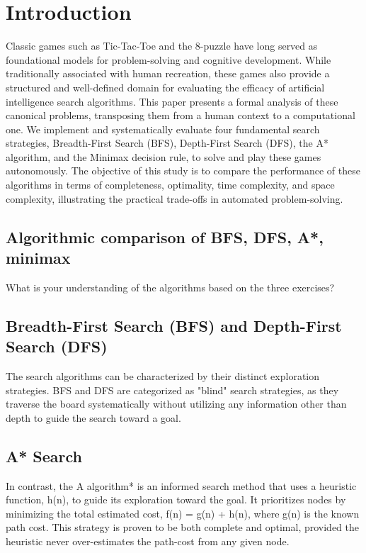 \documentclass[journal]{./IEEE/IEEEtran}
\title{\SPTITLE}
\author{\ADVISEEA~and~\ADVISEEB%
\REMARK
}
\begin{document}
\maketitle

\section{Introduction}
Classic games such as Tic-Tac-Toe and the 8-puzzle have long served as foundational models for problem-solving and cognitive development. While traditionally associated with human recreation, these games also provide a structured and well-defined domain for evaluating the efficacy of artificial intelligence search algorithms. This paper presents a formal analysis of these canonical problems, transposing them from a human context to a computational one. We implement and systematically evaluate four fundamental search strategies, Breadth-First Search (BFS), Depth-First Search (DFS), the A* algorithm, and the Minimax decision rule, to solve and play these games autonomously. The objective of this study is to compare the performance of these algorithms in terms of completeness, optimality, time complexity, and space complexity, illustrating the practical trade-offs in automated problem-solving.

\subsection{Algorithmic comparison of BFS, DFS, A*, minimax}
What is your understanding of the algorithms based on the three exercises?

\subsection{Breadth-First Search (BFS) and Depth-First Search (DFS)}
The search algorithms can be characterized by their distinct exploration strategies. BFS and DFS are categorized as "blind" search strategies, as they traverse the board systematically without utilizing any information other than depth to guide the search toward a goal.\cite{geeksforgeeks-Uninformed-Search-Algorithms-in-AI}

\subsection{A* Search}
In contrast, the A algorithm* is an informed search method that uses a heuristic function, h(n), to guide its exploration toward the goal. It prioritizes nodes by minimizing the total estimated cost, f(n) = g(n) + h(n), where g(n) is the known path cost. This strategy is proven to be both complete and optimal, provided the heuristic never over-estimates the path-cost from any given node.\cite{geeksforgeeks-A-star-Search-Algorithm}
\end{document}
